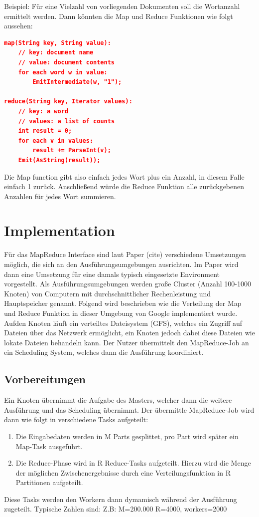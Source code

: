 Beispiel:
Für eine Vielzahl von vorliegenden Dokumenten soll die Wortanzahl ermittelt werden.
Dann könnten die Map und Reduce Funktionen wie folgt aussehen:

\begin{lstlisting}[language=json,firstnumber=1]
map(String key, String value):
	// key: document name
	// value: document contents
	for each word w in value:
		EmitIntermediate(w, "1");

reduce(String key, Iterator values):
	// key: a word
	// values: a list of counts
	int result = 0;
	for each v in values:
		result += ParseInt(v);
	Emit(AsString(result));

\end{lstlisting}

Die Map function gibt also einfach jedes Wort plus ein Anzahl, in diesem Falle einfach 1 zurück.
Anschließend würde die Reduce Funktion alle zurückgebenen Anzahlen für jedes Wort summieren.



\section{Implementation}

Für das MapReduce Interface sind laut Paper (cite) verschiedene Umsetzungen möglich, die sich an den  Ausführungsumgebungen ausrichten.
Im Paper wird dann eine Umsetzung für eine damals typisch eingesetzte Environment vorgestellt.
Als Ausführungsumgebungen werden große Cluster (Anzahl 100-1000 Knoten) von Computern mit durchschnittlicher Rechenleistung und Hauptspeicher genannt.
Folgend wird beschrieben wie die Verteilung der Map und Reduce Funktion in dieser Umgebung von Google implementiert wurde.
Aufden Knoten läuft ein verteiltes Dateisystem (GFS), welches ein Zugriff auf Dateien über das Netzwerk ermöglicht, ein Knoten jedoch dabei diese Dateien wie lokate Dateien behandeln kann.
Der Nutzer übermittelt den MapReduce-Job an ein Scheduling System, welches dann die Ausführung koordiniert.


\subsection*{Vorbereitungen}
Ein Knoten übernimmt die Aufgabe des Masters, welcher dann die weitere Ausführung und das Scheduling übernimmt.
Der übermittle MapReduce-Job wird dann wie folgt in verschiedene Tasks aufgeteilt:
\begin{enumerate}
	\item
	Die Eingabedaten werden in M Parts gesplittet, pro Part wird später ein Map-Task ausgeführt.
	\item
	Die Reduce-Phase wird in R Reduce-Tasks aufgeteilt.
	Hierzu wird die Menge der möglichen Zwischenergebnisse
	durch eine Verteilungsfunktion in R Partitionen aufgeteilt.
\end{enumerate}
Diese Tasks werden den Workern dann dymamisch während der Ausführung zugeteilt.
Typische Zahlen sind: Z.B: M=200.000 R=4000, workers=2000

